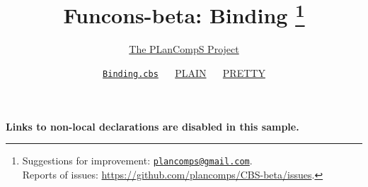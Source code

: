 \documentclass[fleqn]{article}
\title{Funcons-beta: Binding \footnote{
    Suggestions for improvement: \href{mailto:plancomps@gmail.com}{\texttt{plancomps@gmail.com}}.\\
    Reports of issues: \url{https://github.com/plancomps/CBS-beta/issues}.}}
\author{\href{https://plancomps.github.io}{The PLanCompS Project}}
\date{
  \href{https://github.com/plancomps/CBS-beta/blob/math/Funcons-beta/Computations/Normal/Binding/Binding.cbs}{\texttt{Binding.cbs}} ~\textbar~
  \href{/CBS-beta/docs/Funcons-beta/Computations/Normal/Binding/index.html}{PLAIN} ~\textbar~
  \href{/CBS-beta/math/Funcons-beta/Computations/Normal/Binding/index.html}{PRETTY}          
}
\begin{document}
\maketitle
\makeatletter

\textbf{Links to non-local declarations are disabled in this sample.}


\end{document}
